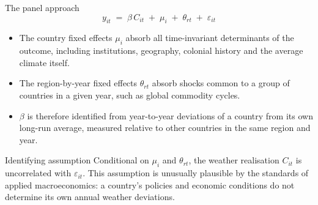 \documentclass[aspectratio=169,10pt]{beamer}
\begin{document}
\begin{frame}{The panel approach}
  \[
    y_{it} \;=\; \beta\, C_{it} \;+\; \mu_i \;+\; \theta_{rt} \;+\; \varepsilon_{it}
  \]
  \begin{itemize}
    \item The country fixed effects $\mu_i$ absorb all time-invariant determinants of
          the outcome, including institutions, geography, colonial history and the
          average climate itself.
    \item The region-by-year fixed effects $\theta_{rt}$ absorb shocks common to a
          group of countries in a given year, such as global commodity cycles.
    \item $\beta$ is therefore identified from year-to-year deviations of a country
          from its own long-run average, measured relative to other countries in the
          same region and year.
  \end{itemize}
  \vspace{4pt}
  \begin{block}{Identifying assumption}
    \small Conditional on $\mu_i$ and $\theta_{rt}$, the weather realisation
    $C_{it}$ is uncorrelated with $\varepsilon_{it}$. This assumption is unusually
    plausible by the standards of applied macroeconomics: a country's policies and
    economic conditions do not determine its own annual weather deviations.
  \end{block}
\end{frame}
\end{document}
